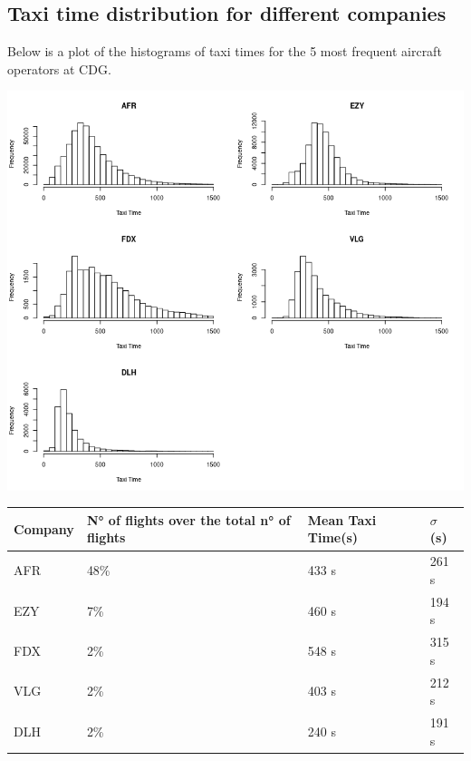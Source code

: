 \documentclass{article}
\begin{document}
\subsection{Taxi time distribution for different companies}
Below is a plot of the histograms of taxi times for the 5 most frequent aircraft operators at CDG.

\bigskip
\begin{minipage}{\textwidth}
	\begin{minipage}[b]{0.5\textwidth}
		\centering
		\includegraphics[scale=0.3]{companiesTaxiTime.png}
		\label{companiesFig}
	\end{minipage}
\hfill
	\begin{minipage}[b]{0.4\linewidth}
		\centering
		\tiny
		\begin{tabular}{p{0.8cm}p{1.3cm}p{0.8cm}p{0.6cm}}\hline
			Company & N° of flights over the total n° of flights & Mean Taxi Time(s) & $\sigma$ (s)\\ \hline
			AFR & 48\%& 433 s & 261 s\\
			EZY & 7\% & 460 s & 194 s\\
			FDX & 2\% & 548 s & 315 s\\ 
			VLG & 2\% & 403 s & 212 s\\
			DLH & 2\% & 240 s & 191 s\\
			\hline
		\end{tabular}
	\bigskip
	\bigskip
		\label{companiesTable}
	\end{minipage}
\end{minipage}
\bigskip
\end{document}
